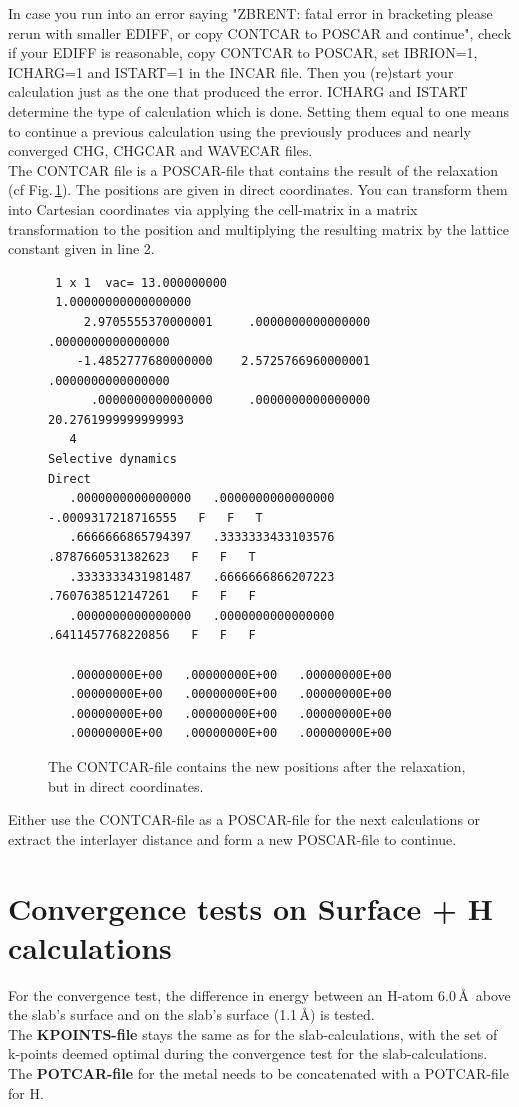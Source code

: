 \documentclass[twoside, 11pt, titlepage, captions=nooneline, a4paper, headsepline]{scrbook}%
\newcommand{\9}{\mathrm}
\newcommand{\0}{\,\mathrm}
\begin{document}
In case you run into an error saying "ZBRENT: fatal error in bracketing please rerun with smaller EDIFF, or copy CONTCAR to POSCAR and continue", check if your EDIFF is reasonable, copy CONTCAR to POSCAR, set IBRION=1, ICHARG=1 and ISTART=1 in the INCAR file. Then you (re)start your calculation just as the one that produced the error. ICHARG and ISTART determine the type of calculation which is done. Setting them equal to one means to continue a previous calculation using the previously produces and nearly converged CHG, CHGCAR and WAVECAR files.\\
The CONTCAR file is a POSCAR-file that contains the result of the relaxation (cf Fig.\,\ref{contcar}). The positions are given in direct coordinates. You can transform them into Cartesian coordinates via applying the cell-matrix in a matrix transformation to the position and multiplying the resulting matrix by the lattice constant given in line 2.
\begin{figure}[h!!]
\begin{verbatim}
 1 x 1  vac= 13.000000000
 1.00000000000000000
     2.9705555370000001     .0000000000000000     .0000000000000000
    -1.4852777680000000    2.5725766960000001     .0000000000000000
      .0000000000000000     .0000000000000000   20.2761999999999993
   4
Selective dynamics
Direct
   .0000000000000000   .0000000000000000  -.0009317218716555   F   F   T
   .6666666865794397   .3333333433103576   .8787660531382623   F   F   T
   .3333333431981487   .6666666866207223   .7607638512147261   F   F   F
   .0000000000000000   .0000000000000000   .6411457768220856   F   F   F

   .00000000E+00   .00000000E+00   .00000000E+00
   .00000000E+00   .00000000E+00   .00000000E+00
   .00000000E+00   .00000000E+00   .00000000E+00
   .00000000E+00   .00000000E+00   .00000000E+00

\end{verbatim}
\caption{The CONTCAR-file contains the new positions after the relaxation, but in direct coordinates.}
\label{contcar}
\end{figure}
Either use the CONTCAR-file as a POSCAR-file for the next calculations or extract the interlayer distance and form a new POSCAR-file to continue.

\section{Convergence tests on Surface + H calculations}
\label{H+slab}
For the convergence test, the difference in energy between an H-atom 6.0\,\AA~above the slab's surface and on the slab's surface (1.1\,\AA) is tested. \\
The \textbf{KPOINTS-file} stays the same as for the slab-calculations, with the set of k-points deemed optimal during the convergence test for the slab-calculations. 
The \textbf{POTCAR-file} for the metal needs to be concatenated with a POTCAR-file for H.
\end{document}
